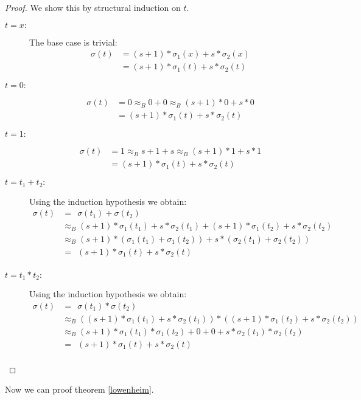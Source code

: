 		\begin{proof}
		We show this by structural induction on $t$.
		\begin{description}
		\item[$t=x:$]The base case is trivial:
				\begin{align*}
				\sigma(t)&=(s+1)*\sigma_1(x)+s*\sigma_2(x)\\
				&=(s+1)*\sigma_1(t)+s*\sigma_2(t)
				\end{align*}
		\item[$t=0:$]
				\begin{align*}
				\sigma(t)&=0
				\approx_B0+0
				\approx_B(s+1)*0+s*0\\
				&=(s+1)*\sigma_1(t)+s*\sigma_2(t)
				\end{align*}
		\item[$t=1:$]
				\begin{align*}
				\sigma(t)&=1
				\approx_Bs+1+s
				\approx_B(s+1)*1+s*1\\
				&=(s+1)*\sigma_1(t)+s*\sigma_2(t)
				\end{align*}
		\item[$t=t_1+t_2:$]Using the induction hypothesis we obtain:
				\begin{align*}
				\sigma(t)&=\ \ \sigma(t_1)+\sigma(t_2)\\
				&\approx_B(s+1)*\sigma_1(t_1)+s*\sigma_2(t_1)+(s+1)*\sigma_1(t_2)+s*\sigma_2(t_2)\\
				&\approx_B(s+1)*(\sigma_1(t_1)+\sigma_1(t_2))+s*(\sigma_2(t_1)+\sigma_2(t_2))\\
				&=\ \ (s+1)*\sigma_1(t)+s*\sigma_2(t)\\
				\end{align*}
		\item[$t=t_1*t_2:$]Using the induction hypothesis we obtain:
				\begin{align*}
				\sigma(t)&=\ \ \sigma(t_1)*\sigma(t_2)\\
				&\approx_B((s+1)*\sigma_1(t_1)+s*\sigma_2(t_1))*((s+1)*\sigma_1(t_2)+s*\sigma_2(t_2))\\
				&\approx_B(s+1)*\sigma_1(t_1)*\sigma_1(t_2)+0+0+s*\sigma_2(t_1)*\sigma_2(t_2)\\
				&=\ \ (s+1)*\sigma_1(t)+s*\sigma_2(t)\\
				\end{align*}
		\end{description}
		\end{proof}
		Now we can proof theorem \ref{lowenheim}. %
